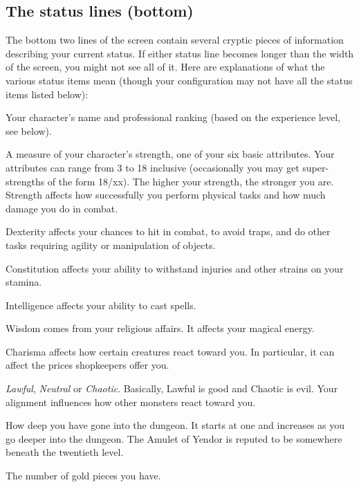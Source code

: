 \subsection*{The status lines (bottom)}

The bottom two lines of the screen contain several cryptic pieces of
information describing your current status.  If either status line
becomes longer than the width of the screen, you might not see all of
it.  Here are explanations of what the various status items mean
(though your configuration may not have all the status items listed
below):

\blist{}
\item[\bb{Rank}]
Your character's name and professional ranking (based on the
experience level, see below).
\item[\bb{Strength}]
A measure of your character's strength, one of your six basic
attributes.  Your attributes can range from 3 to 18 inclusive
(occasionally you may get super-strengths of the form 18/xx).  The
higher your strength, the stronger you are.  Strength affects how
successfully you perform physical tasks and how much damage you do in
combat.
\item[\bb{Dexterity}]
Dexterity affects your chances to hit in combat, to avoid traps, and
do other tasks requiring agility or manipulation of objects.
\item[\bb{Constitution}]
Constitution affects your ability to withstand injuries and other
strains on your stamina.
\item[\bb{Intelligence}]
Intelligence affects your ability to cast spells.
\item[\bb{Wisdom}]
Wisdom comes from your religious affairs.  It affects your magical energy.
\item[\bb{Charisma}]
Charisma affects how certain creatures react toward you.  In
particular, it can affect the prices shopkeepers offer you.
\item[\bb{Alignment}]
%
{\it Lawful}, {\it Neutral\/} or {\it Chaotic}.  Basically, Lawful is
good and Chaotic is evil.  Your alignment influences how other
monsters react toward you.
\item[\bb{Dungeon Level}]
How deep you have gone into the dungeon.  It starts at one and
increases as you go deeper into the dungeon.  The Amulet of Yendor is
reputed to be somewhere beneath the twentieth level.
\item[\bb{Gold}]
The number of gold pieces you have.
\item[\bb{Hit Points}]
